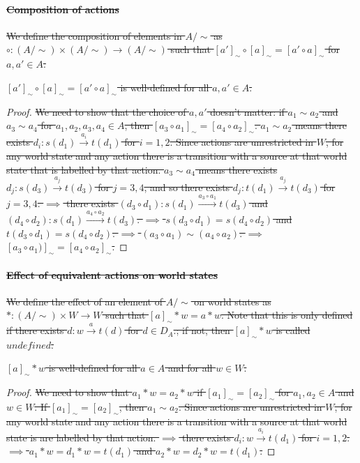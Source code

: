 \paragraph{\sout{Composition of actions}}
\sout{
We define the composition of elements in $A/\sim$ as $\circ: (A/\sim) \times (A/\sim) \to (A/\sim)$ such that $[a']_{\sim} \circ [a]_{\sim} = [a' \circ a]_{\sim}$ for $a,a' \in A$.
		}

	\begin{proposition}
		\sout{
		$[a']_{\sim} \circ [a]_{\sim} = [a' \circ a]_{\sim}$ is well-defined for all $a, a' \in A$.
			}
	\end{proposition}
	\begin{proof}
		\sout{
		We need to show that the choice of $a,a'$ doesn't matter: if $a_{1} \sim a_{2}$ and $a_{3} \sim a_{4}$ for $a_{1}, a_{2}, a_{3}, a_{4} \in A$, then $[a_{3} \circ a_{1}]_{\sim} = [a_{4} \circ a_{2}]_{\sim}$.
		$a_{1} \sim a_{2}$ means there exists $d_{i}: s(d_{1}) \xrightarrow{a_{i}} t(d_{1})$ for $i=1,2$.
		Since actions are unrestricted in $W$, for any world state and any action there is a transition with a source at that world state that is labelled by that action.
		$a_{3} \sim a_{4}$ means there exists $d_{j}: s(d_{3}) \xrightarrow{a_{j}} t(d_{3})$ for $j=3,4$, and so there exists $d_{j}: t(d_{1}) \xrightarrow{a_{j}} t(d_{3})$ for $j=3,4$.
		$\implies$ there exists $(d_{3} \circ d_{1}): s(d_{1}) \xrightarrow{a_{3} \circ a_{1}} t(d_{3})$ and $(d_{4} \circ d_{2}): s(d_{1}) \xrightarrow{a_{4} \circ a_{2}} t(d_{3})$.
		$\implies$ $s(d_{3} \circ d_{1}) = s(d_{4} \circ d_{2})$ and $t(d_{3} \circ d_{1}) = s(d_{4} \circ d_{2})$.
		$\implies$ $(a_{3} \circ a_{1}) \sim (a_{4} \circ a_{2})$.
		$\implies$ $[a_{3} \circ a_{1})]_{\sim} = [a_{4} \circ a_{2}]_{\sim}$.
			}
	\end{proof}

	\paragraph{\sout{Effect of equivalent actions on world states}}
	\sout{
		We define the effect of an element of  $A/\sim$ on world states as $*: (A/\sim) \times W \to W$ such that $[a]_{\sim} * w = a * w$.
		Note that this is only defined if there exists $d: w \xrightarrow{a} t(d)$ for $d \in D_{A}$.; if not, then $[a]_{\sim} * w$ is called $\textit{undefined}$.
	}

	\begin{proposition}
		\sout{
			$[a]_{\sim} * w$ is well-defined for all $a \in A$ and for all $w \in W$.
		}
	\end{proposition}
	\begin{proof}
		\sout{
		We need to show that $a_{1} * w = a_{2} * w$ if $[a_{1}]_{\sim} = [a_{2}]_{\sim}$ for $a_{1},a_{2} \in A$ and $w \in W$.
		If $[a_{1}]_{\sim} = [a_{2}]_{\sim}$, then $a_{1} \sim a_{2}$.
					Since actions are unrestricted in $W$, for any world state and any action there is a transition with a source at that world state is are labelled by that action.
				$\implies$ there exists $d_{i}: w \xrightarrow{a_{i}} t(d_{1})$ for $i=1,2$.
				$\implies$ $a_{1} * w = d_{1} * w = t(d_{1})$ and $a_{2} * w = d_{2} * w = t(d_{1})$.
			}
	\end{proof}

